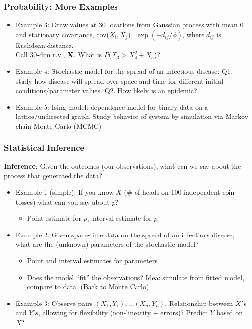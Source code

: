 \documentclass{beamer}
\begin{document}
\begin{frame}
  \frametitle{Probability: More Examples}
\begin{itemize}
\item Example 3: Draw values at 30 locations from Gaussian process
  with mean 0 and stationary covariance,
  cov($X_i,X_j$)=$\exp(-d_{ij}/\phi)$, where $d_{ij}$ is Euclidean distance. \\
Call 30-dim r.v., ${\bf X}$. What is $P(X_3 > X_4^2+X_5$)?
\item Example 4: Stochastic model for the spread of an infectious
  disease: Q1. study how disease will spread over space and time for
  different initial conditions/parameter values. Q2. How likely is an
  epidemic?
\item Example 5: Ising model: dependence model for binary data on a
  lattice/undirected graph. Study behavior of system by simulation 
  via Markov chain Monte Carlo (MCMC)
\end{itemize}
\end{frame}

\begin{frame}
\frametitle{Statistical Inference}
{\bf Inference}: Given the outcomes (our observations), what can we
say about the process that generated the data?
\begin{itemize}
\item Example 1 (simple): If you know $X$ (\# of heads on 100 independent
coin tosses) what can you say about $p$?
\begin{itemize}
\item Point estimate for $p$, interval estimate for $p$
\end{itemize}
\item Example 2: Given space-time data on the spread of an infectious 
disease, what are the (unknown) parameters of the stochastic model?
\begin{itemize}
\item Point and interval estimates for parameters
\item Does the model ``fit'' the observations? Idea: simulate from fitted 
model, compare to data. (Back to Monte Carlo)
\end{itemize}
\item Example 3: Observe pairs $(X_1,Y_1),\dots (X_n,
  Y_n)$. Relationship between $X's$ and $Y's$, allowing for
  flexibility (non-linearity + errors)? Predict $Y$ based on $X$?
\end{itemize}
\end{frame}
\end{document}
